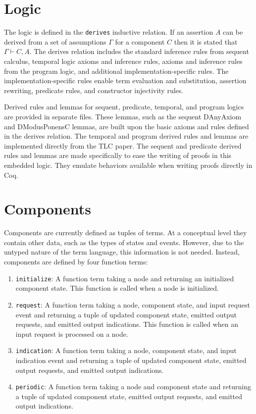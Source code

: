 \documentclass[12pt]{article}
\begin{document}
\section{Logic}

The logic is defined in the \texttt{derives} inductive relation.  If an
assertion $A$ can be derived from a set of assumptions $\Gamma$ for a
component $C$ then it is stated that $\Gamma \vdash C, A$.  The derives
relation includes the standard inference rules from sequent calculus,
temporal logic axioms and inference rules, axioms and inference rules
from the program logic, and additional implementation-specific rules.
The implementation-specific rules enable term evaluation and
substitution, assertion rewriting, predicate rules, and constructor
injectivity rules.

Derived rules and lemmas for sequent, predicate, temporal, and program
logics are provided in separate files.  These lemmas, such as the
sequent DAnyAxiom and DModusPonensC lemmas, are built upon the basic
axioms and rules defined in the derives relation.  The temporal and
program derived rules and lemmas are implemented directly from the TLC
paper.  The sequent and predicate derived rules and lemmas are made
specifically to ease the writing of proofs in this embedded logic.  They
emulate behaviors available when writing proofs directly in Coq.

\section{Components}

Components are currently defined as tuples of terms.  At a conceptual
level they contain other data, such as the types of states and events.
However, due to the untyped nature of the term language, this
information is not needed.  Instead, components are defined by four
function terms:

\begin{enumerate}

  \item \texttt{initialize}: A function term taking a node and returning
    an initialized component state.  This function is called when a node
    is initialized.

  \item \texttt{request}: A function term taking a node, component
    state, and input request event and returning a tuple of updated
    component state, emitted output requests, and emitted output
    indications.  This function is called when an input request is
    processed on a node.

  \item \texttt{indication}: A function term taking a node, component
    state, and input indication event and returning a tuple of updated
    component state, emitted output requests, and emitted output
    indications.

  \item \texttt{periodic}: A function term taking a node and component
    state and returning a tuple of updated component state, emitted
    output requests, and emitted output indications.

\end{enumerate}
\end{document}
